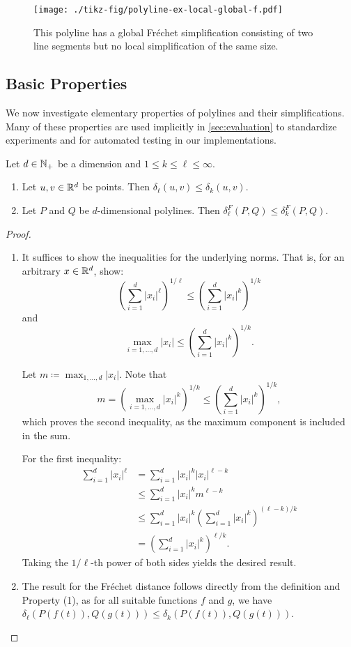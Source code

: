 \begin{figure}[b]
  \centering
  \texttt{[image: ./tikz-fig/polyline-ex-local-global-f.pdf]}
  \caption{This polyline has a global Fréchet simplification consisting of two line segments but no local simplification of the same size.}
  \label{fig:polyline-ex-local-global-f}
\end{figure}

\subsection{Basic Properties}
We now investigate elementary properties of polylines and their simplifications. Many of these properties are used implicitly in \cref{sec:evaluation} to standardize experiments and for automated testing in our implementations.

\begin{lemma}\label{lem:monotonicity_minkowski}
  Let \(d \in \mathbb{N}_+\) be a dimension and \(1 \leq k \leq \ell \leq \infty\).
	\begin{enumerate}
		\item Let \(u, v \in \mathbb{R}^d\) be points. Then \(\delta_\ell(u,v) \leq \delta_k(u, v)\).
		\item Let \(P\) and \(Q\) be \(d\)-dimensional polylines. Then \(\delta_\ell^F(P, Q) \leq \delta_k^F(P, Q)\).
	\end{enumerate}
\end{lemma}

\begin{proof}
  \begin{enumerate}
		\item It suffices to show the inequalities for the underlying norms. That is, for an arbitrary \(x \in \mathbb{R}^d\), show:
			\[\left(\sum_{i=1}^d |x_i|^\ell\right)^{1/\ell} \leq \left(\sum_{i=1}^d |x_i|^k\right)^{1/k}\]
			and
			\[\max_{i=1, \dots, d} |x_i| \leq \left(\sum_{i=1}^d |x_i|^k\right)^{1/k}.\]

			Let \(m \coloneq \max_{1,\dots, d}|x_i|\). Note that
			\[m = \left(\max_{i=1, \dots, d} |x_i|^{k}\right)^{1/k} \leq \left(\sum_{i=1}^d |x_i|^{k}\right)^{1/k},\]
			which proves the second inequality, as the maximum component is included in the sum.

			For the first inequality:
			\begin{align*}
				\sum_{i=1}^d |x_i|^\ell &= \sum_{i=1}^d |x_i|^k|x_i|^{\ell - k} \\
				 &\leq \sum_{i=1}^d |x_i|^k m^{\ell - k} \\
				 &\leq \sum_{i=1}^d |x_i|^k \left(\sum_{i=1}^d |x_i|^{k}\right)^{(\ell-k)/k} \\
				 &= \left(\sum_{i=1}^d |x_i|^{k}\right)^{\ell/k}.
			\end{align*}
			Taking the \(1/\ell\)-th power of both sides yields the desired result.
		\item The result for the Fréchet distance follows directly from the definition and Property (1), as for all suitable functions \(f\) and \(g\), we have \(\delta_\ell(P(f(t)), Q(g(t))) \leq \delta_k(P(f(t)), Q(g(t)))\).
  \end{enumerate}
\end{proof}


